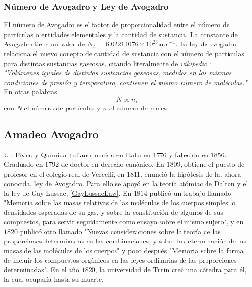 \documentclass[conference]{IEEEtran}
\begin{document}
\subsubsection{Número de Avogadro y Ley de Avogadro}
El número de Avogadro es el factor de proporcionalidad entre el número de partículas o entidades elementales y la cantidad de sustancia. La constante de Avogadro tiene un valor de $N_A = 6.02214076 \times 10^23 \text{mol} ^{-1}$. La ley de avogadro relaciona el nuevo conepto de cantidad de sustancia con el número de partículas para distintas sustancias gaseosas, citando literalmente de \textit{wikipedia} \cite{wiki}: \\	
{\it "Volúmenes iguales de distintas sustancias gaseosas, medidos en las mismas condiciones de presión y temperatura, contienen el mismo número de moléculas."} \\
En otras palabras
	\begin{equation}
		N\propto n, \label{AvogadroLaw}
	\end{equation}
	con $N$ el número de partículas y $n$ el número de moles.
\subsection{Amadeo Avogadro}
Un Físico y Químico italiano, nacido en Italia en $1776$ y fallecido en $1856$. Graduado en $1792$ de doctor en derecho canónico. En $1809$, obtiene el puesto de profesor en el colegio real de Vercelli, en $1811$, enunció la hipótesis de la, ahora conocida, ley de Avogadro. Para ello se apoyó en la teoría atómiac de Dalton y el la ley de Gay-Lussac, \eqref{GayLussacLaw}. En $1814$ publicó un trabajo llamado "Memoria sobre las masas relativas de las moléculas de los cuerpos simples, o densidades esperadas de su gas, y sobre la constitución de algunos de sus compuestos, para servir seguidamente como ensayo sobre el mismo sujeto", y en $1820$ publicó otro llamado "Nuevas consideraciones sobre la teoría de las proporciones determinadas en las combinaciones, y sobre la determinación de las masas de las moléculas de los cuerpos" y poco después "Memoria sobre la forma de incluir los compuestos orgánicos en las leyes ordinarias de las proporciones determinadas". En el año $1820$, la universidad de Turín creó una cátedra para él, la cual ocuparía hasta su muerte.
\end{document}
